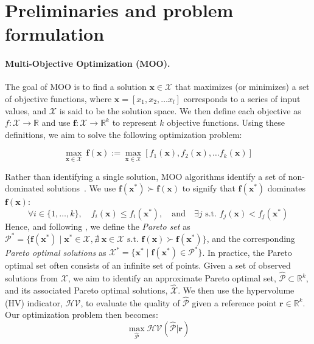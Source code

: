 \section{Preliminaries and problem formulation}
\label{sec:prelims}

\paragraph{Multi-Objective Optimization (MOO).}
The goal of MOO is to find a solution $\mathbf{x} \in \mathcal{X}$ that maximizes (or minimizes) a set of objective functions, where $\mathbf{x} = [x_1, x_2, \dots x_l]$ corresponds to a series of input values, and $\mathcal{X}$ is said to be the solution space. We then define each objective as $f : \mathcal{X} \rightarrow \mathbb{R}$ and use $\mathbf{f} : \mathcal{X} \rightarrow\mathbb{R}^k$ to represent $k$ objective functions. Using these definitions, we aim to solve the following optimization problem:

\begin{equation}
\max_{\mathbf{x} \in \mathcal{X}} ~\mathbf{f(x)} := \max_{\mathbf{x} \in \mathcal{X}} \left[ f_1(\mathbf{x}),f_2(\mathbf{x}), \dots f_k(\mathbf{x})\right]
\label{eq:moo}
\end{equation}

Rather than identifying a single solution, MOO algorithms identify a set of non-dominated solutions~\citep{deb2016multi}. We use $\mathbf{f(x^*)} \succ \mathbf{f(x)}$ to signify that $\mathbf{f(x^*)}$ dominates $\mathbf{f(x)}$:
\begin{equation}
\forall i \in \{1, \dots, k\}, \quad f_i(\mathbf{x}) \leq f_i(\mathbf{x^*}),  \quad \text{and}\quad  \exists j \text{ s.t. } f_j(\mathbf{x}) < f_j(\mathbf{x^*})
\end{equation}
Hence, and following \cite{daulton2021parallel}, we define the \emph{Pareto set} as $\mathcal{P}^* = \{ \mathbf{f(x^*)} \mid \mathbf{x^*}\in \mathcal{X}, \nexists \; \mathbf{x} \in \mathcal{X} \text{ s.t. } \mathbf{f(x)} \succ \mathbf{f(x^*)} \}$, and the corresponding \emph{Pareto optimal solutions} as $\mathcal{X^*} = \{ \mathbf{x^*} \mid \mathbf{f(x^*)} \in \mathcal{P}^*\}$. In practice, the Pareto optimal set often consists of an infinite set of points. Given a set of observed solutions from $\mathcal{X}$, %
we aim to identify an approximate Pareto optimal set, $\mathcal{\hat{P}} \subset \mathbb{R}^k$, and its associated Pareto optimal solutions, $\mathcal{\hat{X}}$. We then use the hypervolume (HV) indicator, $\mathcal{HV}$, to evaluate the quality of $\mathcal{\hat{P}}$ given a reference point $\mathbf{r} \in \mathbb{R}^k$. Our optimization problem then becomes:
\begin{equation}
    \label{eq:objective}
    \max_{\mathcal{\hat{P}}} \mathcal{HV}(\mathcal{\hat{P}}|\mathbf{r})
\end{equation}

